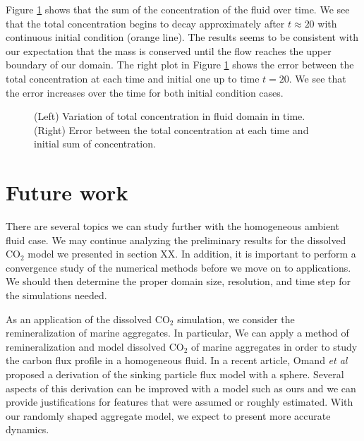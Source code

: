 \par
Figure \ref{fig_sumC} shows that the sum of the concentration of the fluid over time. We see that the total concentration begins to decay approximately after $t \approx 20$ with continuous initial condition (orange line).
The results seems to be consistent with our expectation that the mass is conserved until the flow reaches the upper boundary of our domain. The right plot in Figure \ref{fig_sumC} shows the error between the total concentration at each time and initial one up to time $t = 20$. We see that the error increases over the time for both initial condition cases.  
 \begin{figure}[ht]
 \begin{center}
 \end{center}
 \caption{(Left) Variation of total concentration in fluid domain in time. (Right) Error between the total concentration at each time and initial sum of concentration.}
 \label{fig_sumC}
 \end{figure}
 \section{Future work}
 There are several topics we can study further with the homogeneous ambient fluid case. We may continue analyzing the preliminary results for the dissolved CO$_2$ model we presented in section XX. In addition, it is important to perform a convergence study of the numerical methods before we move on to applications. We should then determine the proper domain size, resolution, and time step for the simulations needed.
 \par
 As an application of the dissolved CO$_2$ simulation, we consider the remineralization of marine aggregates. In particular, We can apply a method of remineralization and model dissolved CO$_2$ of marine aggregates in order to study the carbon flux profile in a homogeneous fluid.
 In a recent article, Omand {\it{et al}} \cite{omand_sinking_2020} proposed a derivation of the sinking particle flux model with a sphere.
 Several aspects of this derivation can be improved with a model such as ours and we can provide justifications for features that were assumed or roughly estimated.
  With our randomly shaped aggregate model, we expect to present more accurate dynamics. 
